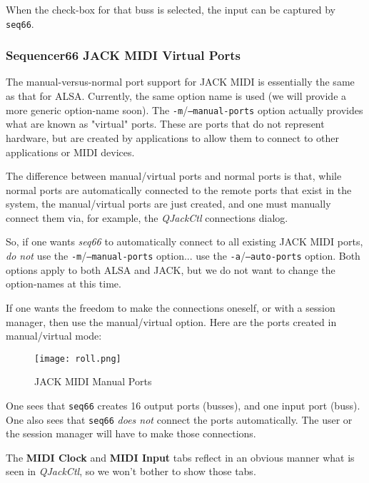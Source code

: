    When the check-box for that buss is selected, the input can be captured by
   \texttt{seq66}.

\subsubsection{Sequencer66 JACK MIDI Virtual Ports}
\label{subsubsec:seq66_jack_midi_virtual_ports}

   The manual-versus-normal port support for JACK MIDI is essentially the same
   as that for ALSA.  Currently, the same option name is used (we will provide
   a more generic option-name soon).
   The \texttt{-m}/\texttt{--manual-ports} option actually provides what
   are known as "virtual" ports.  These are ports that do not represent
   hardware, but are created by applications to allow them to connect to other
   applications or MIDI devices.

   The difference between manual/virtual ports and normal ports is that, while
   normal ports are automatically connected to the remote ports that exist in
   the system, the manual/virtual ports are just created, and one must
   manually connect them via, for example, the
   \textsl{QJackCtl} connections dialog.

   So, if one wants \textsl{seq66} to automatically connect to all existing
   JACK MIDI ports, \textsl{do not} use the
   \texttt{-m}/\texttt{--manual-ports} option... use the
   \texttt{-a}/\texttt{--auto-ports} option.  Both options apply to both
   ALSA and JACK, but we do not want to change the option-names at this time.

   If one wants the freedom to make the connections oneself, or with a session
   manager, then use the manual/virtual option.
   Here are the ports created in manual/virtual mode:

\begin{figure}[H]
   \centering 
   \texttt{[image: roll.png]}
   \caption{JACK MIDI Manual Ports}
   \label{fig:seq66_jack_nano_yosh_midi_manual}
\end{figure}

   One sees that \texttt{seq66} creates 16 output ports (busses), and one input
   port (buss).  One also sees that \texttt{seq66} \textsl{does not} connect
   the ports automatically.  The user or the session manager will have to make
   those connections.

   The \textbf{MIDI Clock} and \textbf{MIDI Input} tabs reflect in an obvious
   manner what is seen in \textsl{QJackCtl}, so we won't bother to show those
   tabs.

